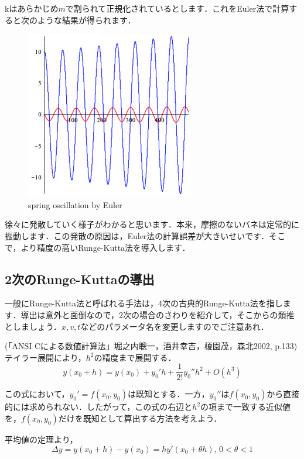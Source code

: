 \documentclass[11pt,dvipdfmx]{jsarticle}
\makeatletter
\def\maxwidth{\ifdim\Gin@nat@width>\linewidth\linewidth
    \else\Gin@nat@width\fi}
\let\Oldincludegraphics\includegraphics
\renewcommand{\includegraphics}[1]{\Oldincludegraphics[width=.8\maxwidth]{#1}}
\makeatother
\begin{document}
    kはあらかじめ\(m\)で割られて正規化されているとします．これをEuler法で計算すると次のような結果が得られます．

\begin{figure}[htbp]
\centering
\includegraphics{../figs/Euler_ball_dropplot2d3.jpg}
\caption{spring oscillation by Euler}
\end{figure}

徐々に発散していく様子がわかると思います．本来，摩擦のないバネは定常的に振動します．この発散の原因は，Euler法の計算誤差が大きいせいです．そこで，より精度の高いRunge-Kutta法を導入します．

    \subsection{2次のRunge-Kuttaの導出}\label{ux6b21ux306erunge-kuttaux306eux5c0eux51fa}

一般にRunge-Kutta法と呼ばれる手法は，4次の古典的Runge-Kutta法を指します．導出は意外と面倒なので，2次の場合のさわりを紹介して，そこからの類推としましょう．\(x,v,t\)などのパラメータ名を変更しますのでご注意あれ．

(「ANSI Cによる数値計算法」堀之内聰一，酒井幸吉，榎園茂，森北2002,
p.133) テイラー展開により，\(h^2\)の精度まで展開する． \[
y(x_0+h) = y(x_0) +y_0'h+\frac{1}{2!}y_0''h^2 + O(h^3)
\]

この式において，\(y_0' = f(x_0,y_0)\)は既知とする．一方，\(y_0''\)は\(f(x_0,y_0)\)から直接的には求められない．したがって，この式の右辺と\(h^2\)の項まで一致する近似値を，\(f(x_0,y_0)\)だけを既知として算出する方法を考えよう．

平均値の定理より， \[
\Delta y = y(x_0+h)-y(x_0) = hy'(x_0 + \theta h), \, 0<\theta<1
\]
\end{document}
